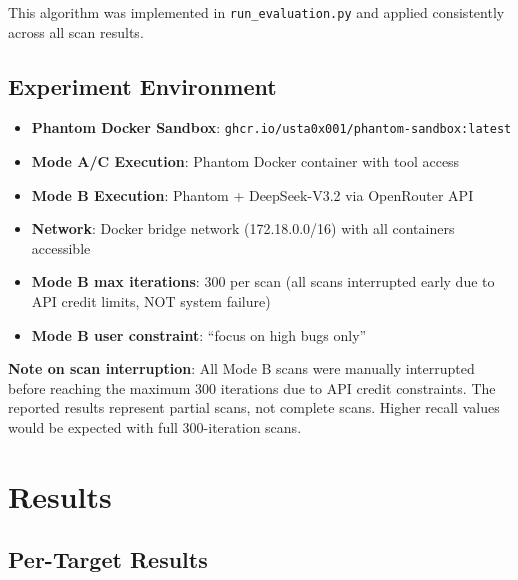 \documentclass[12pt,a4paper,oneside]{book}
\begin{document}
This algorithm was implemented in \texttt{run\_evaluation.py} and applied consistently across all scan results.

\section{Experiment Environment}

\begin{itemize}
    \item \textbf{Phantom Docker Sandbox}: \texttt{ghcr.io/usta0x001/phantom-sandbox:latest}
    \item \textbf{Mode A/C Execution}: Phantom Docker container with tool access
    \item \textbf{Mode B Execution}: Phantom + DeepSeek-V3.2 via OpenRouter API
    \item \textbf{Network}: Docker bridge network (172.18.0.0/16) with all containers accessible
    \item \textbf{Mode B max iterations}: 300 per scan (all scans interrupted early due to API credit limits, NOT system failure)
    \item \textbf{Mode B user constraint}: ``focus on high bugs only''
\end{itemize}

\textbf{Note on scan interruption}: All Mode B scans were manually interrupted before reaching the maximum 300 iterations due to API credit constraints. The reported results represent partial scans, not complete scans. Higher recall values would be expected with full 300-iteration scans.

\chapter{Results}

\section{Per-Target Results}
\end{document}
